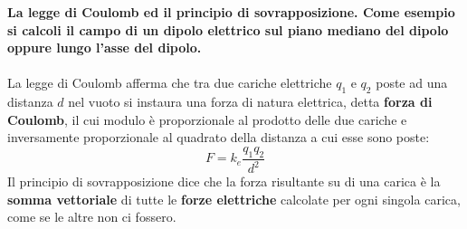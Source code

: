 \documentclass{article}
\begin{document}
    

\textbf{La legge di Coulomb ed il principio di sovrapposizione.  Come esempio si calcoli il campo di un dipolo elettrico sul  piano mediano del dipolo oppure lungo l'asse del dipolo.}
\\~\\
La legge di Coulomb afferma che tra due cariche elettriche $q_1$ e $q_2$ poste ad una distanza $d$ nel vuoto
si instaura una forza di natura elettrica, detta \textbf{forza di Coulomb}, il cui modulo è proporzionale al prodotto delle due cariche
e inversamente proporzionale al quadrato della distanza a cui esse sono poste:
\begin{equation}
    F = k_e \frac{q_1q_2}{d^2}
\end{equation}
Il principio di sovrapposizione dice che la forza risultante su di una carica è la \textbf{somma vettoriale}
di tutte le \textbf{forze elettriche} calcolate per ogni singola carica, come se le altre non ci fossero.
\end{document}
